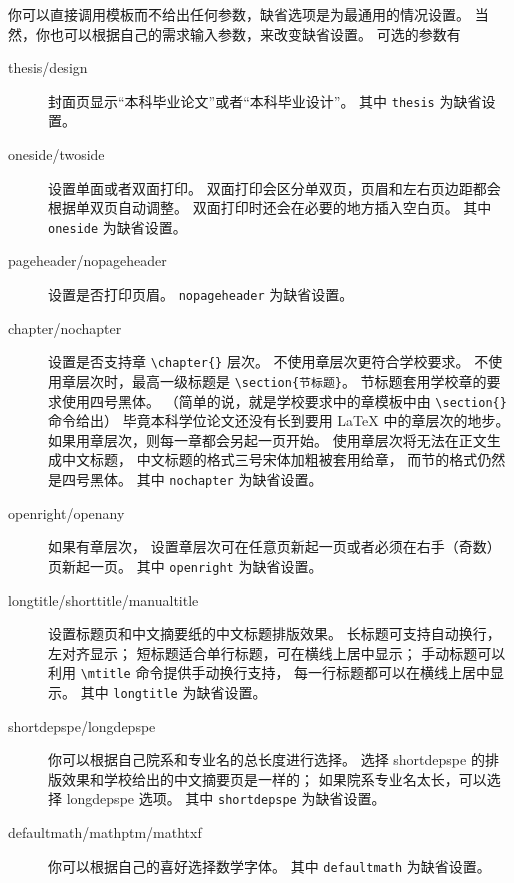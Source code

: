 你可以直接调用模板而不给出任何参数，缺省选项是为最通用的情况设置。
当然，你也可以根据自己的需求输入参数，来改变缺省设置。
可选的参数有
\begin{description}
  \item[thesis/design] 封面页显示“本科毕业论文”或者“本科毕业设计”。
    其中 \texttt{thesis} 为缺省设置。
  \item[oneside/twoside] 设置单面或者双面打印。
    双面打印会区分单双页，页眉和左右页边距都会根据单双页自动调整。
    双面打印时还会在必要的地方插入空白页。
    其中 \texttt{oneside} 为缺省设置。
  \item[pageheader/nopageheader] 设置是否打印页眉。
    \texttt{nopageheader} 为缺省设置。
  \item[chapter/nochapter] 设置是否支持章 \verb|\chapter{}| 层次。
    不使用章层次更符合学校要求。
    不使用章层次时，最高一级标题是 \verb|\section{节标题}|。
    节标题套用学校章的要求使用四号黑体。
    （简单的说，就是学校要求中的章模板中由 \verb|\section{}| 命令给出）
    毕竟本科学位论文还没有长到要用 \LaTeX{} 中的章层次的地步。
    如果用章层次，则每一章都会另起一页开始。
    使用章层次将无法在正文生成中文标题，
    中文标题的格式三号宋体加粗被套用给章，
    而节的格式仍然是四号黑体。
    其中 \texttt{nochapter} 为缺省设置。
  \item[openright/openany] 如果有章层次，
    设置章层次可在任意页新起一页或者必须在右手（奇数）页新起一页。
    其中 \texttt{openright} 为缺省设置。
  \item[longtitle/shorttitle/manualtitle]
    设置标题页和中文摘要纸的中文标题排版效果。
    长标题可支持自动换行，左对齐显示；
    短标题适合单行标题，可在横线上居中显示；
    手动标题可以利用 \verb|\mtitle| 命令提供手动换行支持，
    每一行标题都可以在横线上居中显示。
    其中 \texttt{longtitle} 为缺省设置。
  \item[shortdepspe/longdepspe]
    你可以根据自己院系和专业名的总长度进行选择。
    选择 shortdepspe 的排版效果和学校给出的中文摘要页是一样的；
    如果院系专业名太长，可以选择 longdepspe 选项。
    其中 \texttt{shortdepspe} 为缺省设置。
  \item[defaultmath/mathptm/mathtxf] 你可以根据自己的喜好选择数学字体。
    其中 \texttt{defaultmath} 为缺省设置。
\end{description}


